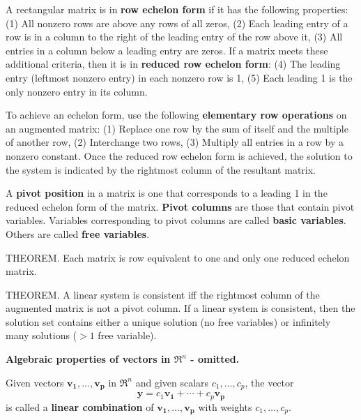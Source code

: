\documentclass{article}
\begin{document}
\hfill \newline
A rectangular matrix is in \textbf{row echelon form} if it has the following properties: (1) All nonzero rows are above any rows of all zeros, (2) Each leading entry of a row is in a column to the right of the leading entry of the row above it, (3) All entries in a column below a leading entry are zeros. If a matrix meets these additional criteria, then it is in \textbf{reduced row echelon form}: (4) The leading entry (leftmost nonzero entry) in each nonzero row is 1, (5) Each leading 1 is the only nonzero entry in its column. 

\hfill \newline
To achieve an echelon form, use the following \textbf{elementary row operations} on an augmented matrix: (1) Replace one row by the sum of itself and the multiple of another row, (2) Interchange two rows, (3) Multiply all entries in a row by a nonzero constant. Once the reduced row echelon form is achieved, the solution to the system is indicated by the rightmost column of the resultant matrix.

\hfill \newline A \textbf{pivot position} in a matrix is one that corresponds to a leading 1 in the reduced echelon form of the matrix. \textbf{Pivot columns} are those that contain pivot variables. Variables corresponding to pivot columns are called \textbf{basic variables}. Others are called \textbf{free variables}.

\hfill \newline \noindent THEOREM. Each matrix is row equivalent to one and only one reduced echelon matrix.

\hfill \newline \noindent THEOREM. A linear system is consistent iff the rightmost column of the augmented matrix is not a pivot column. If a linear system is consistent, then the solution set contains either a unique solution (no free variables) or infinitely many solutions ($>1$ free variable).

\hfill \newline
\textbf{Algebraic properties of vectors in $\Re^n$ - omitted.}

\hfill \newline Given vectors $\mathbf{v_1},\dots,\mathbf{v_p}$ in $\Re^n$ and given scalars $c_1,\dots,c_p$, the vector
\begin{equation}
\mathbf{y} = c_1\mathbf{v_1}+\cdots+c_p\mathbf{v_p} 
\end{equation}
is called a \textbf{linear combination} of $\mathbf{v_1},\dots,\mathbf{v_p}$ with weights $c_1,\dots,c_p$.
\end{document}
